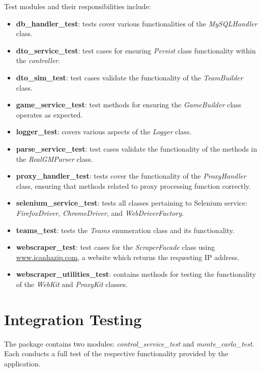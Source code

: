 \documentclass{thesis-ekf}
\theoremstyle{definition}
\theoremstyle{remark}
\begin{document}
Test modules and their responsibilities include:
\begin{itemize}
	\item \textbf{db\_handler\_test}: tests cover various functionalities of the \emph{MySQLHandler} class.

	\item \textbf{dto\_service\_test}: test cases for ensuring \emph{Persist} class functionality within the \emph{controller}.

	\item \textbf{dto\_sim\_test}: test cases validate the functionality of the \emph{TeamBuilder} class.

	\item \textbf{game\_service\_test}: test methods for ensuring the \emph{GameBuilder}
	class operates as expected.
	
	\item \textbf{logger\_test}: covers various aspects of the \emph{Logger} class.
	
	\item \textbf{parse\_service\_test}: test cases validate the functionality of the methods in the \emph{RealGMParser} class.
	
	\item \textbf{proxy\_handler\_test}: tests cover the functionality of the \emph{ProxyHandler} class, ensuring that methods related to proxy processing function correctly.
	
	\item \textbf{selenium\_service\_test}: tests all classes pertaining to Selenium service: \emph{FirefoxDriver}, \emph{ChromeDriver}, and \emph{WebDriverFactory}.
	
	\item \textbf{teams\_test}: tests the \emph{Teams} enumeration class and its functionality.
	
	\item \textbf{webscraper\_test}: test cases for the \emph{ScraperFacade} class using \url{www.icanhazip.com}, a website which returns the requesting IP address.
	
	\item \textbf{webscraper\_utilities\_test}: contains methods for testing the functionality of the \emph{WebKit} and \emph{ProxyKit} classes.
\end{itemize}
	

\section{Integration Testing}
The package contains two modules: \emph{control\_service\_test} and \emph{monte\_carlo\_test}. Each conducts a full test of the respective functionality provided by the application. 
\end{document}
